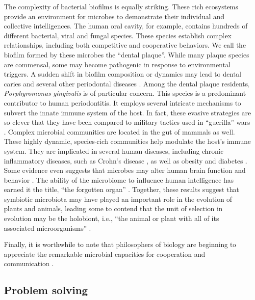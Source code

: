 The complexity of bacterial biofilms is equally striking. These rich ecosystems provide an environment for microbes to demonstrate their individual and collective intelligences. The human oral cavity, for example, contains hundreds of different bacterial, viral and fungal species. These species establish complex relationships, including both competitive and cooperative behaviors. We call the biofilm formed by these microbes the ``dental plaque''. While many plaque species are commensal, some may become pathogenic in response to environmental triggers. A sudden shift in biofilm composition or dynamics may lead to dental caries and several other periodontal diseases \cite{avila_oral_2009}. Among the dental plaque residents, \textit{Porphyromonas gingivalis} is of particular concern. This species is a predominant contributor to human periodontitis. It employs several intricate mechanisms to subvert the innate immune system of the host. In fact, these evasive strategies are so clever that they have been compared to military tactics used in ``guerilla'' wars \cite{hajishengallis_porphyromonas_2009}. Complex microbial communities are located in the gut of mammals as well. These highly dynamic, species-rich communities help modulate the host's immune system. They are implicated in several human diseases, including chronic inflammatory diseases, such as Crohn's disease \cite{macfarlane_mucosal_2011,clemente_impact_2012}, as well as obesity \cite{ridaura_gut_2013} and diabetes \cite{everard_diabetes_2013}. Some evidence even suggests that microbes may alter human brain function and behavior \cite{cryan_mind-altering_2012}. The ability of the microbiome to influence human intelligence has earned it the title, ``the forgotten organ'' \cite{relman_meaning_2001}. Together, these results suggest that symbiotic microbiota may have played an important role in the evolution of plants and animals, leading some to contend that the unit of selection in evolution may be the holobiont, i.e., ``the animal or plant with all of its associated microorganisms'' \cite{zilber-rosenberg_role_2008}.

Finally, it is worthwhile to note that philosophers of biology are beginning to appreciate the remarkable microbial capacities for cooperation and communication \cite{omalley_size_2007,omalley_towards_2007,omalley_philosophy_2013}.

\subsection{Problem solving}

